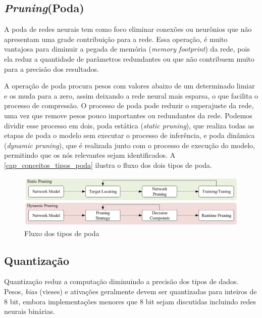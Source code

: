 \subsection{\textit{Pruning}(Poda)}\label{poda}

A poda de redes neurais tem como foco eliminar conexões ou neurônios que não apresentam uma grade contribuição para a
rede.
Essa operação, é muito vantajosa para diminuir a pegada de memória (\textit{memory footprint}) da rede, pois ela reduz
a quantidade de parâmetros redundantes ou que não contribuem muito para a precisão dos resultados.


A operação de poda procura pesos com valores abaixo de um determinado limiar e os muda para a zero, assim deixando
a rede neural mais esparsa, o que facilita o processo de compressão.
O processo de poda pode reduzir o superajuste da rede, uma vez que remove pesos pouco importantes ou redundantes
da rede.
Podemos dividir esse processo em dois, poda estática (\textit{static pruning}), que realiza todas as etapas de poda
o modelo sem executar o processo de inferência, e poda dinâmica (\textit{dynamic pruning}), que é realizada junto com
o processo de execução do modelo, permitindo que os nós relevantes sejam identificados. A \autoref{cap_conceitos_tipos_poda}
ilustra o fluxo dos dois tipos de poda.

\begin{figure}[htb]
	\caption {\label{cap_conceitos_tipos_poda}Fluxo dos tipos de poda}
	\begin{center}
		\includegraphics[scale=0.5]{Imagens/categorias-poda}
	\end{center}
\end{figure}

\subsection{Quantização}\label{quantizacao}

Quantização reduz a computação diminuindo a precisão dos tipos de dados. Pesos, \textit{bias} (vieses) e ativações
geralmente devem ser quantizadas para inteiros de 8 bit, embora implementações menores que 8 bit sejam discutidas
incluindo redes neurais binárias. \cite{LIANG2021370}

